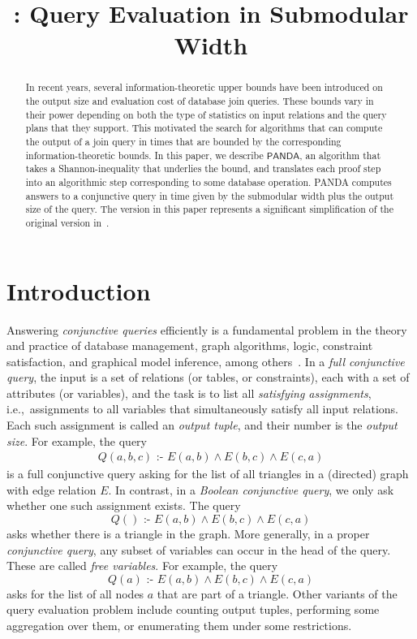 \documentclass{theoretics}
\title{\panda: Query Evaluation in Submodular Width}
\newcommand{\cd}{\text{ :- }}
\newcommand{\panda}{\textsf{PANDA}\xspace}
\begin{document}
\maketitle

\begin{abstract}
    In recent years, several information-theoretic upper bounds have been introduced on the
    output size and evaluation cost of database join queries. These bounds vary in their
    power depending on both the type of statistics on input relations and the query plans
    that they support.  This motivated the search for algorithms that can compute the output
    of a join query in times that are bounded by the corresponding information-theoretic
    bounds.  In this paper, we describe $\panda$, an algorithm that takes a
    Shannon-inequality that underlies the bound, and translates each proof step into an
    algorithmic step corresponding to some database operation.  \panda computes answers to a
    conjunctive query in time given by the submodular width plus the output size of the
    query. The version in this paper represents a significant simplification of the original
    version in~\cite{DBLP:conf/pods/Khamis0S17}.
\end{abstract}


\section{Introduction}
Answering {\em conjunctive queries} efficiently is a fundamental problem in the theory and
practice of database management, graph algorithms, logic, constraint satisfaction, and
graphical model inference, among
others~\cite{DBLP:conf/pods/KhamisNR16,DBLP:conf/pods/GottlobGLS16,DBLP:journals/talg/GroheM14,DBLP:books/aw/AbiteboulHV95}.
In a {\em full conjunctive query}, the input is a set of relations (or tables, or
constraints), each with a set of attributes (or variables), and the task is to list all {\em
satisfying assignments}, i.e.,~assignments to all variables that simultaneously satisfy all
input relations.  Each such assignment is called an {\em output tuple}, and their number is
the {\em output size}. For example, the query
\begin{align}
Q(a,b,c) \cd E(a,b) \wedge E(b,c) \wedge E(c,a) \label{eqn:triangle}
\end{align}
is a full conjunctive query asking for the list of all triangles in a (directed) graph with
edge relation $E$.
In contrast, in a {\em Boolean conjunctive query}, we only ask whether one such
assignment exists. The query
\[ Q() \cd E(a,b) \wedge E(b,c) \wedge E(c,a) \]
asks whether there is a triangle in the graph.
More generally, in a proper {\em conjunctive query}, any subset of variables can occur in
the head of the query. These are called {\em free variables}. For example, the query
\[ Q(a) \cd E(a,b) \wedge E(b,c) \wedge E(c,a) \]
asks for the list of all nodes $a$ that are part of a triangle.
Other variants of the query evaluation problem include counting output
tuples, performing some aggregation over them, or enumerating them under some restrictions.
\end{document}
